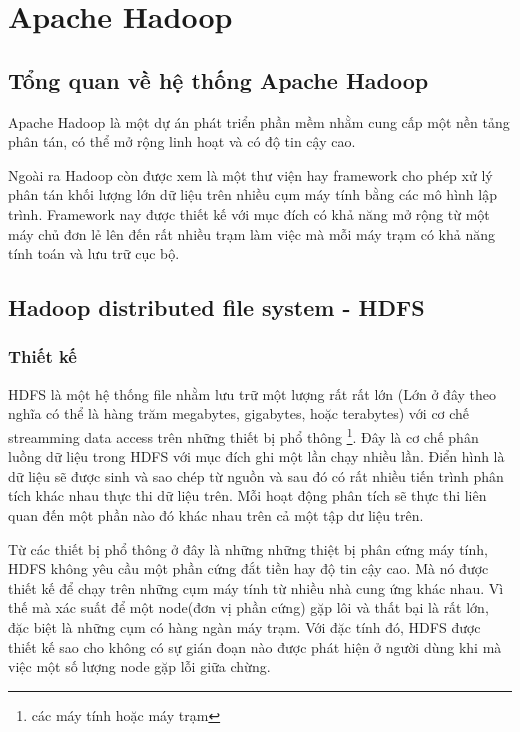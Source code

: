 \chapter{Apache Hadoop}
\section{Tổng quan về hệ thống Apache Hadoop}
Apache Hadoop là một dự án phát triển phần mềm nhằm cung cấp một nền tảng phân tán, có thể mở rộng linh hoạt và có độ tin cậy cao.\par
Ngoài ra Hadoop còn được xem là một thư viện hay framework cho phép xử lý phân tán khối lượng lớn dữ liệu trên nhiều cụm máy tính bằng các mô hình lập trình. Framework nay được thiết kế với mục đích có khả năng mở rộng từ một máy chủ đơn lẻ lên đến rất nhiều trạm làm việc mà mỗi máy trạm có khả năng tính toán và lưu trữ cục bộ.
\section{Hadoop distributed file system - HDFS}
\subsection{Thiết kế}
HDFS là một hệ thống file nhằm lưu trữ một lượng rất rất lớn (Lớn ở đây theo nghĩa có thể là hàng trăm megabytes, gigabytes, hoặc terabytes) với cơ chế streamming data access trên những thiết bị phổ thông \footnote{các máy tính hoặc máy trạm}.
 Đây là cơ chế phân luồng dữ liệu trong HDFS với mục đích ghi một lần chạy nhiều lần. Điển hình là dữ liệu sẽ được sinh và sao chép từ nguồn và sau đó có rất nhiều tiến trình phân tích khác nhau thực thi dữ liệu trên. Mỗi hoạt động phân tích sẽ thực thi liên quan đến một phần nào đó khác nhau trên cả một tập dư liệu trên.\par
 Từ các thiết bị phổ thông ở đây là những những thiệt bị phân cứng máy tính, HDFS không yêu cầu một phần cứng đắt tiền hay độ tin cậy cao. Mà nó được thiết kế để chạy trên những cụm máy tính từ nhiều nhà cung ứng khác nhau. Vì thế mà xác suất để một node(đơn vị phần cứng) gặp lôi và thất bại là rất lớn, đặc biệt là những cụm có hàng ngàn máy trạm. Với đặc tính đó, HDFS được thiết kế sao cho không có sự gián đoạn nào được phát hiện ở người dùng khi mà việc một số lượng node gặp lỗi giữa chừng.\par

